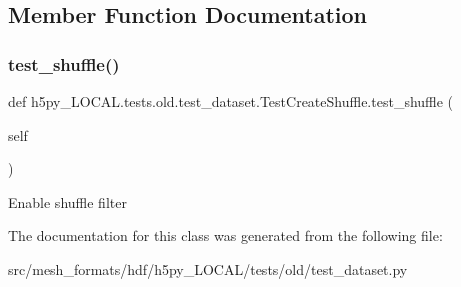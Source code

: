 \subsection{Member Function Documentation}
\mbox{\label{classh5py__LOCAL_1_1tests_1_1old_1_1test__dataset_1_1TestCreateShuffle_a93acbaad36db232e04bce87c83920095}} 
\subsubsection{\texorpdfstring{test\+\_\+shuffle()}{test\_shuffle()}}
{\footnotesize\ttfamily def h5py\+\_\+\+L\+O\+C\+A\+L.\+tests.\+old.\+test\+\_\+dataset.\+Test\+Create\+Shuffle.\+test\+\_\+shuffle (\begin{DoxyParamCaption}\item[{}]{self }\end{DoxyParamCaption})}

\begin{DoxyVerb}Enable shuffle filter \end{DoxyVerb}
 

The documentation for this class was generated from the following file\+:\begin{DoxyCompactItemize}
\item 
src/mesh\+\_\+formats/hdf/h5py\+\_\+\+L\+O\+C\+A\+L/tests/old/test\+\_\+dataset.\+py\end{DoxyCompactItemize}
